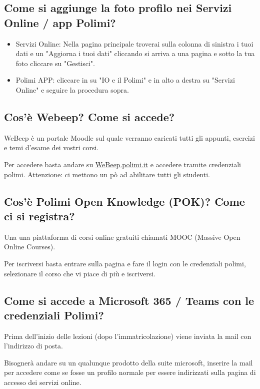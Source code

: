 \documentclass[legal]{polinetwork}
\begin{document}
\subsection{Come si aggiunge la foto profilo nei Servizi Online / app Polimi?}


\begin{itemize}
  \item Servizi Online: Nella pagina principale troverai sulla colonna di sinistra i tuoi dati e un "Aggiorna i tuoi dati" cliccando si arriva a una pagina e sotto la tua foto cliccare su "Gestisci".
  \item Polimi APP: cliccare in su "IO e il Polimi" e in alto a destra su "Servizi Online" e seguire la procedura sopra.
\end{itemize}


\subsection{Cos'è Webeep? Come si accede?}


WeBeep è un portale Moodle sul quale verranno caricati tutti gli appunti, esercizi e temi d'esame dei vostri corsi.

Per accedere basta andare su \href{https://webeep.polimi.it/login/index.php}{WeBeep.polimi.it} e accedere tramite credenziali polimi. Attenzione: ci mettono un pò ad abilitare tutti gli studenti.

\subsection{Cos'è Polimi Open Knowledge (POK)? Come ci si registra?}


Una una piattaforma di corsi online gratuiti chiamati MOOC (Massive Open Online Courses).

Per iscriversi basta entrare sulla pagina e fare il login con le credenziali polimi, selezionare il corso che vi piace di più e iscriversi.

\subsection{Come si accede a Microsoft 365 / Teams con le credenziali Polimi?}


Prima dell’inizio delle lezioni (dopo l’immatricolazione) viene inviata la mail con l’indirizzo di posta.

Bisognerà andare su un qualunque prodotto della suite microsoft, inserire la mail per accedere come se fosse un profilo normale per essere indirizzati sulla pagina di accesso dei servizi online.
\end{document}
